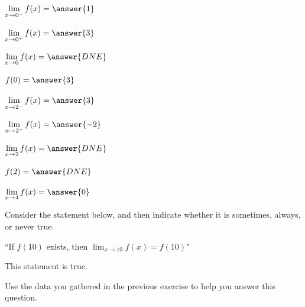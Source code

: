 \documentclass[handout]{ximera}
\begin{document}
\begin{exercise}
\begin{enumerate}
\begin{multicols}{3}
\item $\displaystyle\lim_{x\to 0^-} f(x) =\answer{1}$ 

\item $\displaystyle\lim_{x\to 0^+} f(x) = \answer{3}$ 

\item $\displaystyle\lim_{x\to 0} f(x) = \answer{DNE}$ 

\item $f(0) = \answer{3}$

\item $\displaystyle\lim_{x\to 2^-} f(x) =\answer{3}$ 

\item $\displaystyle\lim_{x\to 2^+} f(x) = \answer{-2}$ 

\item $\displaystyle\lim_{x\to 2} f(x) = \answer{DNE}$ 

\item $f(2) = \answer{DNE}$

\item $\displaystyle\lim_{x\to 4} f(x) = \answer{0}$ 

\end{multicols}

\end{enumerate}

\end{exercise}

\begin{exercise}

Consider the statement below, and then indicate whether it is sometimes, always, or never true.

``If $f(10)$ exists, then $\displaystyle\lim_{x\to 10} f(x) = f(10)$"

This statement is  true.

\begin{hint}

Use the data you gathered in the previous exercise to help you answer this question.  

\end{hint}

\end{exercise}
\end{document}

